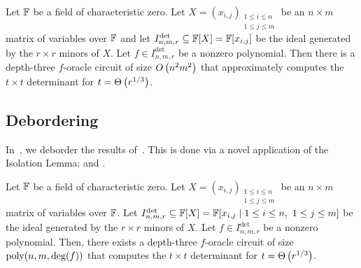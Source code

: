 \documentclass[letterpaper, 11pt]{amsart}
\newif\iffull
\begin{document}
\begin{thrm}[{\cite[Theorem~1.1]{AF22}}]\label{thrm:AF_det}
  Let $\F$ be a field of characteristic zero.
  Let $X = (x_{i,j})_{\substack{1 \leq i \leq n \\ 1 \leq j \leq m}}$ be an $n \times m$ matrix of variables over $\F$ and let $I^{\det}_{n,m,r} \subseteq \mathbb{F}[X] = \mathbb{F}[x_{i,j}]$ be the ideal generated by the $r \times r$ minors of $X$.
  Let $f\in  I^{\det}_{n,m,r}$ be a nonzero polynomial.
  Then there is a depth-three $f$-oracle circuit of size $O\kern-0.0pt\left(n^2 m^2\right)$ that approximately computes the $t \times t$ determinant for $t = \bigTheta{r^{1/3}}$.
\end{thrm}

\iffull
\begin{thrm}[{\cite[Theorem~1.1]{AF22}}]\label{thrm:AF_pfaff}
  Let $\F$ be a field of characteristic zero.
  Let $X = (x_{i,j})_{1 \leq i, j \leq 2n}$ be a $2n \times 2n$ matrix of variables over $\F$ and let $I^{\pfaff}_{2n,2r} \subseteq \F[X] = \F[x_{i,j}]$ be the ideal generated by the Pfaffians of the $2r \times 2r$ principal submatrices of $X$.
  Let $f \in  I^{\pfaff}_{2n, 2r}$ be a nonzero polynomial.
  Then there is a depth-three $f$-oracle circuit of size $\bigO{n^4}$ that approximately computes the $t \times t$ Pfaffian for $t = \bigTheta{r^{1/3}}$.
\end{thrm}
\fi

\iffull
\clearpage
\fi

\subsection{Debordering}

In~\cite{DG25}, we deborder the results of~\cite{AF22}.
This is done via a novel application of the Isolation Lemma:  and .

\begin{thrm}\label{thrm:main}
  Let $\F$ be a field of characteristic zero.
  Let $X = (x_{i,j})_{\substack{1 \leq i \leq n \\ 1 \leq j \leq m}}$ be an $n \times m$ matrix of variables over $\F$.
  Let $I^{\det}_{n,m,r} \subseteq \mathbb{F}[X] = \mathbb{F}[x_{i,j} \mid 1 \leq i \leq n,\ 1 \leq j \leq m]$ be the ideal generated by the $r \times r$ minors of $X$.
  Let $f \in I^{\det}_{n,m,r}$ be a nonzero polynomial.
  Then, there exists a depth-three $f$-oracle circuit of size $\operatorname{poly}(n, m, \deg(f))$ that computes the $t \times t$ determinant for $t = \bigTheta{r^{1/3}}$.
\end{thrm}
\end{document}
